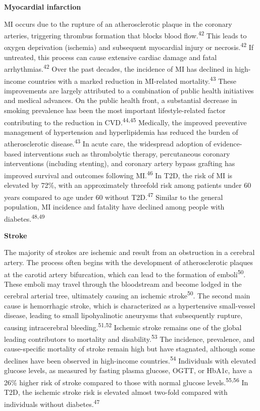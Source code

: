 \documentclass[
  a4paper,
  headsepline=true,
  open=any]{scrbook}
\begin{document}
\textbf{Myocardial infarction}

MI occurs due to the rupture of an atherosclerotic plaque in the
coronary arteries, triggering thrombus formation that blocks blood
flow.\textsuperscript{42} This leads to oxygen deprivation (ischemia)
and subsequent myocardial injury or necrosis.\textsuperscript{42} If
untreated, this process can cause extensive cardiac damage and fatal
arrhythmias.\textsuperscript{42} Over the past decades, the incidence of
MI has declined in high-income countries with a marked reduction in
MI-related mortality.\textsuperscript{43} These improvements are largely
attributed to a combination of public health initiatives and medical
advances. On the public health front, a substantial decrease in smoking
prevalence has been the most important lifestyle-related factor
contributing to the reduction in CVD.\textsuperscript{44,45} Medically,
the improved preventive management of hypertension and hyperlipidemia
has reduced the burden of atherosclerotic disease.\textsuperscript{43}
In acute care, the widespread adoption of evidence-based interventions
such as thrombolytic therapy, percutaneous coronary interventions
(including stenting), and coronary artery bypass grafting has improved
survival and outcomes following MI.\textsuperscript{46} In T2D, the risk
of MI is elevated by 72\%, with an approximately threefold risk among
patients under 60 years compared to age under 60 without
T2D.\textsuperscript{47} Similar to the general population, MI incidence
and fatality have declined among people with
diabetes.\textsuperscript{48,49}

\textbf{Stroke}

The majority of strokes are ischemic and result from an obstruction in a
cerebral artery. The process often begins with the development of
atherosclerotic plaques at the carotid artery bifurcation, which can
lead to the formation of emboli\textsuperscript{50}. These emboli may
travel through the bloodstream and become lodged in the cerebral
arterial tree, ultimately causing an ischemic
stroke\textsuperscript{50}. The second main cause is hemorrhagic stroke,
which is characterized as a hypertensive small-vessel disease, leading
to small lipohyalinotic aneurysms that subsequently rupture, causing
intracerebral bleeding.\textsuperscript{51,52} Ischemic stroke remains
one of the global leading contributors to mortality and
disability.\textsuperscript{53} The incidence, prevalence, and
cause-specific mortality of stroke remain high but have stagnated,
although some declines have been observed in high-income
countries.\textsuperscript{54} Individuals with elevated glucose levels,
as measured by fasting plasma glucose, OGTT, or HbA1c, have a 26\%
higher risk of stroke compared to those with normal glucose
levels.\textsuperscript{55,56} In T2D, the ischemic stroke risk is
elevated almost two-fold compared with individuals without
diabetes.\textsuperscript{47}
\end{document}
